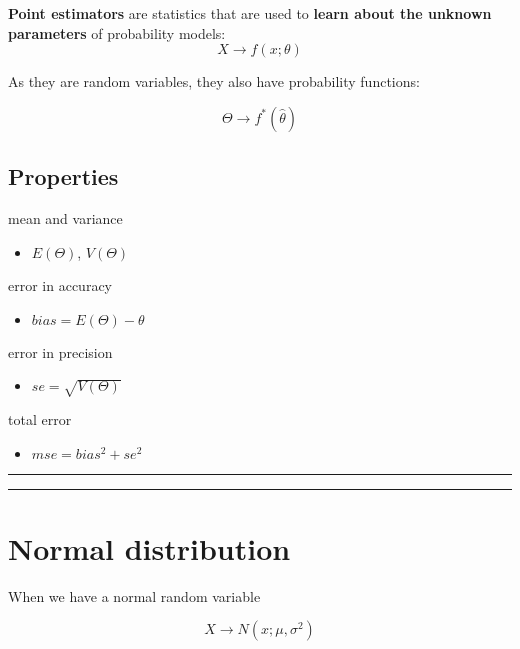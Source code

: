 \documentclass[
]{book}
\providecommand{\tightlist}{%
  \setlength{\itemsep}{0pt}\setlength{\parskip}{0pt}}
\begin{document}
\textbf{Point estimators} are statistics that are used to \textbf{learn about the unknown parameters} of probability models:
\[X \rightarrow f(x; \theta)\]

As they are random variables, they also have probability functions:

\[\Theta \rightarrow f^{*}(\hat{\theta})\]

\hypertarget{properties}{%
\subsection{Properties}\label{properties}}

mean and variance

\begin{itemize}
\tightlist
\item
  \(E(\Theta)\), \(V(\Theta)\)
\end{itemize}

error in accuracy

\begin{itemize}
\tightlist
\item
  \(bias=E(\Theta) - \theta\)
\end{itemize}

error in precision

\begin{itemize}
\tightlist
\item
  \(se=\sqrt{V(\Theta)}\)
\end{itemize}

total error

\begin{itemize}
\tightlist
\item
  \(mse=bias^2 + se^2\)
\end{itemize}

\begin{center}\rule{0.5\linewidth}{0.5pt}\end{center}

\begin{center}\rule{0.5\linewidth}{0.5pt}\end{center}

\hypertarget{normal-distribution-8}{%
\section{Normal distribution}\label{normal-distribution-8}}

When we have a normal random variable

\[X \rightarrow N(x; \mu, \sigma^2)\]
\end{document}
